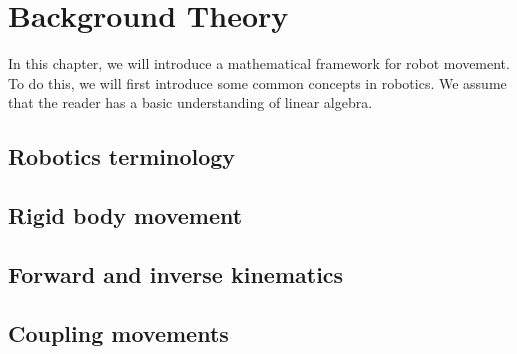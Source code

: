 \chapter{Background Theory} %
\label{ch:theory}

In this chapter, we will introduce a mathematical framework for robot
movement.  To do this, we will first introduce some common concepts in
robotics.  We assume that the reader has a basic understanding of linear
algebra.

\section{Robotics terminology}

\section{Rigid body movement}

\section{Forward and inverse kinematics}

\section{Coupling movements}
